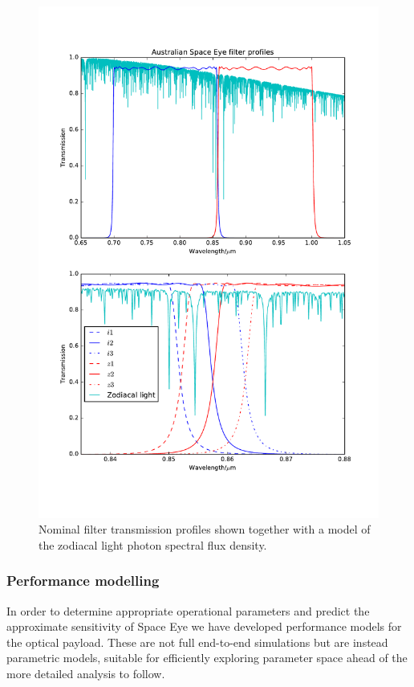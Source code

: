 \documentclass[]{iac}
\begin{document}
\begin{figure}[htp]
  \center \includegraphics[width=\columnwidth]{figures/filters.pdf}
  \caption{\label{fig:filters}Nominal filter transmission profiles shown together with a model of the zodiacal light
    photon spectral flux density.}
\end{figure}

\subsubsection{Performance modelling} \label{sec:perf}

In order to determine appropriate operational parameters and predict the approximate sensitivity of Space Eye we have
developed performance models for the optical payload. These are not full end-to-end simulations but are instead
parametric models, suitable for efficiently exploring parameter space ahead of the more detailed analysis to follow.
\end{document}
